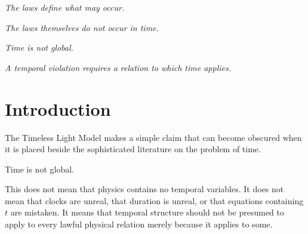 \documentclass[12pt,onecolumn]{article}
\theoremstyle{plain}
\theoremstyle{definition}
\theoremstyle{remark}
\begin{document}
\begin{abstract}
This paper compares TLM with Wheeler--DeWitt, Page--Wootters, and relational
quantum time without treating those approaches as straw men. Considerable
compatibility may exist among them. The distinctive TLM claim is narrower
and architectural: lawful structure is prior to the physical relations it
permits, time is not a universal variable of that structure, and temporal
properties apply only within the lawful relations for which temporal
structure is supplied.

\end{abstract}


\begin{center}

\textit{The laws define what may occur.}

\vspace{0.4em}

\textit{The laws themselves do not occur in time.}

\vspace{0.4em}

\textit{Time is not global.}

\vspace{0.4em}

\textit{A temporal violation requires a relation to which time applies.}

\end{center}

\vspace{0.7em}

\clearpage
\tableofcontents
\clearpage


\section{Introduction}

The Timeless Light Model makes a simple claim that can become obscured when
it is placed beside the sophisticated literature on the problem of time.

Time is not global.

This does not mean that physics contains no temporal variables. It does
not mean that clocks are unreal, that duration is unreal, or that equations
containing \(t\) are mistaken. It means that temporal structure should not
be presumed to apply to every lawful physical relation merely because it
applies to some.
\end{document}
